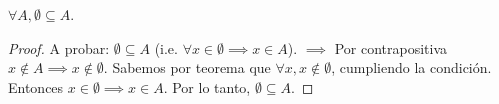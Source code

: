 





	\begin{problema}
		$\forall A, \emptyset \subseteq A$. 
	\end{problema}

\begin{proof}
	A probar: $\emptyset \subseteq A$ (i.e. $\forall x\in \emptyset \implies x\in A$). $\implies$ Por contrapositiva $x\not\in A\implies x\not\in\emptyset$.  Sabemos por teorema que $\forall x, x\not\in \emptyset$, cumpliendo la condición. Entonces $x\in \emptyset \implies x\in A$. Por lo tanto, $\emptyset \subseteq A$. 

\end{proof}





